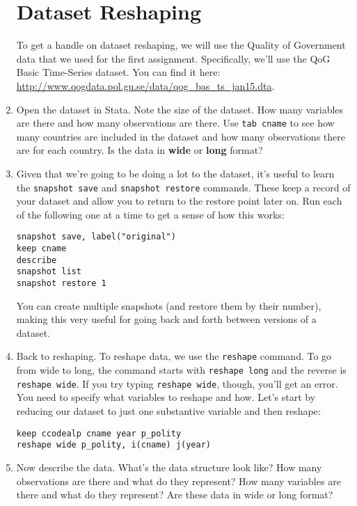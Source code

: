 \documentclass[a4paper,12pt]{article}
\begin{document}
\begin{enumerate}
\section*{Dataset Reshaping}

To get a handle on dataset reshaping, we will use the Quality of Government data that we used for the first assignment. Specifically, we'll use the QoG Basic Time-Series dataset. You can find it here: \url{http://www.qogdata.pol.gu.se/data/qog_bas_ts_jan15.dta}.

\item Open the dataset in Stata. Note the size of the dataset. How many variables are there and how many observations are there. Use \texttt{tab cname} to see how many countries are included in the dataset and how many observations there are for each country. Is the data in \textbf{wide} or \textbf{long} format?

\item Given that we're going to be doing a lot to the dataset, it's useful to learn the \texttt{snapshot save} and \texttt{snapshot restore} commands. These keep a record of your dataset and allow you to return to the restore point later on. Run each of the following one at a time to get a sense of how this works:

\begin{verbatim}
snapshot save, label("original")
keep cname
describe
snapshot list
snapshot restore 1
\end{verbatim}

\noindent You can create multiple snapshots (and restore them by their number), making this very useful for going back and forth between versions of a dataset.

\item Back to reshaping. To reshape data, we use the \texttt{reshape} command. To go from wide to long, the command starts with \texttt{reshape long} and the reverse is \texttt{reshape wide}. If you try typing \texttt{reshape wide}, though, you'll get an error. You need to specify what variables to reshape and how. Let's start by reducing our dataset to just one substantive variable and then reshape:

\begin{verbatim}
keep ccodealp cname year p_polity
reshape wide p_polity, i(cname) j(year)
\end{verbatim}

\item Now describe the data. What's the data structure look like? How many observations are there and what do they represent? How many variables are there and what do they represent? Are these data in wide or long format?


\end{enumerate}
\end{document}
